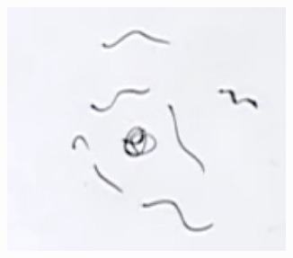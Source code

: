 \documentclass[]{article}
\begin{document}
\begin{figure}[H]
\begin{subfigure}[t]{0.45\textwidth}
		\includegraphics[width=0.9\textwidth]{2-1-electron-photons}
	\end{subfigure}

\end{figure}
\end{document}

